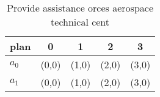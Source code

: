 \documentclass[a4paper]{article}
\begin{document}
\begin{table}
\begin{adjustbox}{width=0.7\columnwidth}
\begin{tabular}{|l|l|l|l|l|}
\hline
\textbf{plan} & \multicolumn{1}{c|}{\textbf{0}} & \multicolumn{1}{c|}{\textbf{1}} & \multicolumn{1}{c|}{\textbf{2}} & \multicolumn{1}{c|}{\textbf{3}} \\ \hline
\textbf{$a_0$}  & (0,0) & (1,0) & (2,0) & (3,0) \\ \hline
\textbf{$a_1$}  & (0,0) & (1,0) & (2,0) & (3,0) \\ \hline
\end{tabular}
\end{adjustbox}
\caption{Provide assistance orces aerospace technical cent
}
\end{table}
\end{document}
